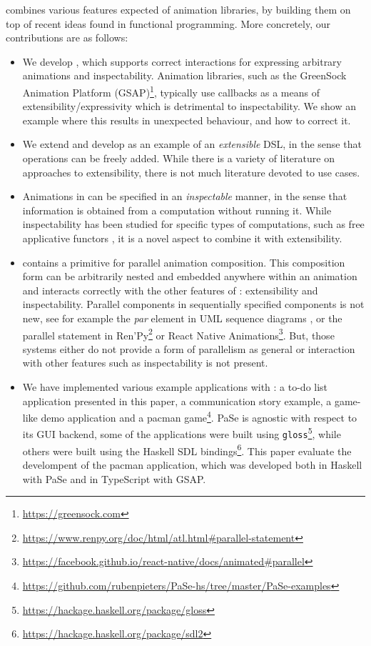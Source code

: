 \dsl{} combines various features expected of animation libraries, by building them on top of recent ideas found in functional programming. More concretely, our contributions are as follows:
\begin{itemize}
\item We develop \dsl{}, which supports correct interactions for expressing arbitrary animations and inspectability. Animation libraries, such as the GreenSock Animation Platform (GSAP)\footnote{\url{https://greensock.com}}, typically use callbacks as a means of extensibility/expressivity which is detrimental to inspectability. We show an example where this results in unexpected behaviour, and how to correct it.
\item We extend and develop \dsl{} as an example of an \emph{extensible} DSL, in the sense that operations can be freely added. While there is a variety of literature on approaches to extensibility, there is not much literature devoted to use cases.
\item Animations in \dsl{} can be specified in an \emph{inspectable} manner, in the sense that information is obtained from a computation without running it. While inspectability has been studied for specific types of computations, such as free applicative functors \cite{DBLP:journals/corr/CapriottiK14}, it is a novel aspect to combine it with extensibility.
\item \dsl{} contains a primitive for parallel animation composition. This composition form can be arbitrarily nested and embedded anywhere within an animation and interacts correctly with the other features of \dsl{}: extensibility and inspectability. Parallel components in sequentially specified components is not new, see for example the \emph{par} element in UML sequence diagrams \cite{umlspec}, or the parallel statement in Ren'Py\footnote{\url{https://www.renpy.org/doc/html/atl.html\#parallel-statement}} or React Native Animations\footnote{\url{https://facebook.github.io/react-native/docs/animated\#parallel}}. But, those systems either do not provide a form of parallelism as general or interaction with other features such as inspectability is not present.
\item We have implemented various example applications with \dsl{}: a to-do list application presented in this paper, a communication story example, a game-like demo application and a pacman game\footnote{\url{https://github.com/rubenpieters/PaSe-hs/tree/master/PaSe-examples}}. PaSe is agnostic with respect to its GUI backend, some of the applications were built using \texttt{gloss}\footnote{\url{https://hackage.haskell.org/package/gloss}}, while others were built using the Haskell SDL bindings\footnote{\url{https://hackage.haskell.org/package/sdl2}}. This paper evaluate the develompent of the pacman application, which was developed both in Haskell with PaSe and in TypeScript with GSAP.
\end{itemize}
